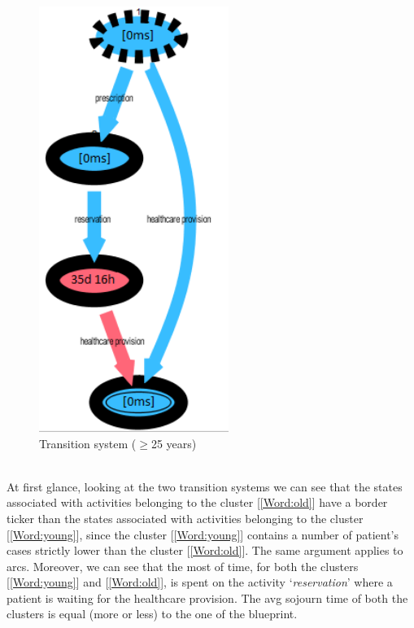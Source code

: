 \begin{figure} [htbp]
\begin{minipage}[t]{0.5\textwidth}
\includegraphics[width=0.55\textwidth]{AmbulatorioSojournOlds}
\caption{Transition system ($\geq$25 years)}
\end{minipage}
\end{figure}\\
At first glance, looking at the two transition systems we can see that the states associated with activities belonging to the cluster [\ref{Word:old}] have a border ticker than the states associated with activities belonging to the cluster [\ref{Word:young}], since the cluster [\ref{Word:young}] contains a number of patient's cases strictly lower than the cluster [\ref{Word:old}]. The same argument applies to arcs. Moreover, we can see that the most of time, for both the clusters [\ref{Word:young}] and [\ref{Word:old}], is spent on the activity `\textit{reservation}' where a patient is waiting for the healthcare provision. %
The avg sojourn time of both the clusters is equal (more or less) to the one of the blueprint.
\clearpage
\noindent
